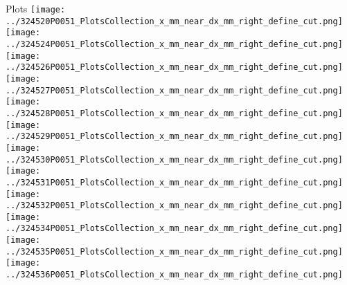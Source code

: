 \documentclass{beamer}
\begin{document}
\begin{frame}
\begin{block}{Plots}
                \texttt{[image: ../324520P0051\_PlotsCollection\_x\_mm\_near\_dx\_mm\_right\_define\_cut.png]}
                \texttt{[image: ../324524P0051\_PlotsCollection\_x\_mm\_near\_dx\_mm\_right\_define\_cut.png]}
                \texttt{[image: ../324526P0051\_PlotsCollection\_x\_mm\_near\_dx\_mm\_right\_define\_cut.png]}
                \texttt{[image: ../324527P0051\_PlotsCollection\_x\_mm\_near\_dx\_mm\_right\_define\_cut.png]}\\
                \texttt{[image: ../324528P0051\_PlotsCollection\_x\_mm\_near\_dx\_mm\_right\_define\_cut.png]}
                \texttt{[image: ../324529P0051\_PlotsCollection\_x\_mm\_near\_dx\_mm\_right\_define\_cut.png]}
                \texttt{[image: ../324530P0051\_PlotsCollection\_x\_mm\_near\_dx\_mm\_right\_define\_cut.png]}
                \texttt{[image: ../324531P0051\_PlotsCollection\_x\_mm\_near\_dx\_mm\_right\_define\_cut.png]}
                \texttt{[image: ../324532P0051\_PlotsCollection\_x\_mm\_near\_dx\_mm\_right\_define\_cut.png]}\\
                \texttt{[image: ../324534P0051\_PlotsCollection\_x\_mm\_near\_dx\_mm\_right\_define\_cut.png]}
                \texttt{[image: ../324535P0051\_PlotsCollection\_x\_mm\_near\_dx\_mm\_right\_define\_cut.png]}
                \texttt{[image: ../324536P0051\_PlotsCollection\_x\_mm\_near\_dx\_mm\_right\_define\_cut.png]}

        \end{block}
\end{frame}
\end{document}
